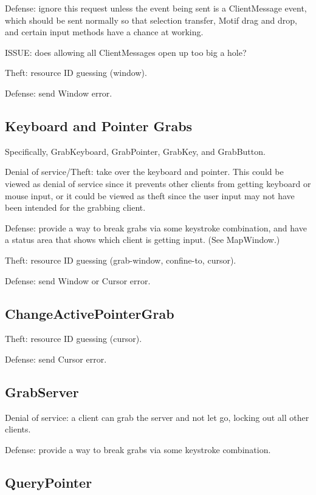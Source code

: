 Defense: ignore this request unless the event being sent is a
ClientMessage event, which should be sent normally so that selection
transfer, Motif drag and drop, and certain input methods have a chance
at working.

ISSUE: does allowing all ClientMessages open up too big a hole?

Theft: resource ID guessing (window).

Defense: send Window error.



\subsection{Keyboard and Pointer Grabs}

Specifically, GrabKeyboard, GrabPointer, GrabKey, and GrabButton.

Denial of service/Theft: take over the keyboard and pointer.  This
could be viewed as denial of service since it prevents other clients
from getting keyboard or mouse input, or it could be viewed as theft
since the user input may not have been intended for the grabbing
client.

Defense: provide a way to break grabs via some keystroke combination,
and have a status area that shows which client is getting input.
(See MapWindow.)

Theft: resource ID guessing (grab-window, confine-to, cursor).

Defense: send Window or Cursor error.



\subsection{ChangeActivePointerGrab}

Theft: resource ID guessing (cursor).

Defense: send Cursor error.



\subsection{GrabServer}

Denial of service: a client can grab the server and not let go,
locking out all other clients.

Defense: provide a way to break grabs via some keystroke combination.



\subsection{QueryPointer}


